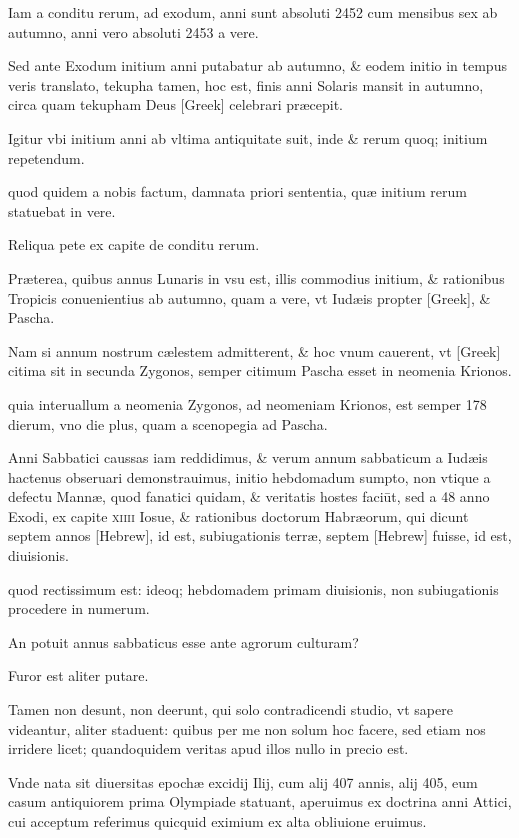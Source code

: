 \begin{parnumbers}
Iam a conditu rerum, ad exodum,
anni sunt absoluti 2452 cum mensibus sex ab autumno, anni vero
absoluti 2453 a vere.

Sed ante Exodum initium anni putabatur ab
autumno, \& eodem initio in tempus veris translato, tekupha tamen,
hoc est, finis anni Solaris mansit in autumno, circa quam tekupham
Deus \textgreek{[Greek]} celebrari præcepit.

Igitur vbi initium anni
ab vltima antiquitate suit, inde \& rerum quoq; initium repetendum.

quod quidem a nobis factum, damnata priori sententia, quæ
initium rerum statuebat in vere.

Reliqua pete ex capite de conditu
rerum.

Præterea, quibus annus Lunaris in vsu est, illis commodius
initium, \& rationibus Tropicis conuenientius ab autumno, quam
a vere, vt Iudæis propter \textgreek{[Greek]}, \& Pascha.

Nam si annum
nostrum cælestem admitterent, \& hoc vnum cauerent, vt \textgreek{[Greek]}
citima sit in secunda Zygonos, semper citimum Pascha esset in neomenia
Krionos.

quia interuallum a neomenia Zygonos, ad neomeniam
Krionos, est semper 178 dierum, vno die plus, quam a scenopegia
ad Pascha.

Anni Sabbatici caussas iam reddidimus, \& verum
annum sabbaticum a Iudæis hactenus obseruari demonstrauimus,
initio hebdomadum sumpto, non vtique a defectu Mannæ,
quod fanatici quidam, \& veritatis hostes faciūt, sed a 48 anno Exodi,
ex capite \textsc{xiiii} Iosue, \& rationibus doctorum Habræorum, qui
dicunt septem annos \texthebrew{[Hebrew]}, id est, subiugationis terræ, septem \texthebrew{[Hebrew]}
fuisse, id est, diuisionis.

quod rectissimum est: ideoq; hebdomadem
primam diuisionis, non subiugationis procedere in numerum.

An
potuit annus sabbaticus esse ante agrorum culturam?

Furor est aliter putare.

Tamen non desunt, non deerunt, qui solo contradicendi
studio, vt sapere videantur, aliter staduent: quibus per me non solum
hoc facere, sed etiam nos irridere licet; quandoquidem veritas apud
illos nullo in precio est.

Vnde nata sit diuersitas epochæ excidij Ilij,
cum alij 407 annis, alij 405, eum casum antiquiorem prima Olympiade
statuant, aperuimus ex doctrina anni Attici, cui acceptum
referimus quicquid eximium ex alta obliuione eruimus.


\end{parnumbers}
